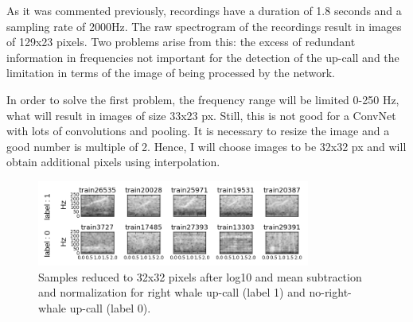 \documentclass[]{article}
\begin{document}
As it was commented previously, recordings have a duration of 1.8 seconds and a sampling rate of 2000Hz. The raw spectrogram of the recordings result in images of 129x23 pixels. Two problems arise from this: the excess of redundant information in frequencies not important for the detection of the up-call and the limitation in terms of the image of being processed by the network.

In order to solve the first problem, the frequency range will be limited 0-250 Hz, what will result in images of size 33x23 px. Still, this is not good for a ConvNet with lots of convolutions and pooling. It is necessary to resize the image and a good number is multiple of 2. Hence, I will choose images to be 32x32 px and will obtain additional pixels using interpolation. %

\begin{figure}[htpb!]
\centering
\includegraphics[width= 0.8\textwidth]{./images/2_samples_cropped}
\caption{Samples reduced to 32x32 pixels after log10 and mean subtraction and normalization for right whale up-call (label 1) and no-right-whale up-call (label 0).  \label{img:samples_processed}}
\end{figure} 
\end{document}
